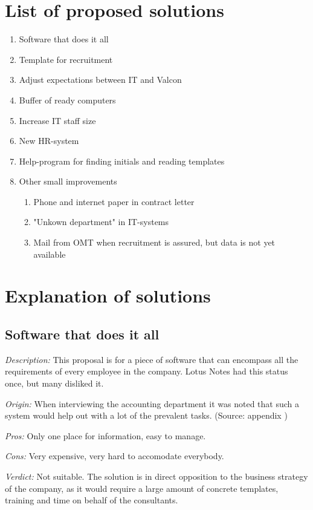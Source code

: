 \label{app:solution_propositions}
\section{List of proposed solutions}
\begin{enumerate}
\item Software that does it all
\item Template for recruitment
\item Adjust expectations between IT and Valcon
\item Buffer of ready computers
\item Increase IT staff size
\item New HR-system
\item Help-program for finding initials and reading templates
	\item Other small improvements
	\begin{enumerate}
	\item Phone and internet paper in contract letter
	\item "Unkown department" in IT-systems
	\item Mail from OMT when recruitment is assured, but data is not yet available
	\end{enumerate}
\end{enumerate}

\section{Explanation of solutions}
\subsection{Software that does it all}
\emph{Description:} This proposal is for a piece of software that can encompass all the requirements of every employee in the company. Lotus Notes had this status once, but many disliked it.

\emph{Origin:}
When interviewing the accounting department it was noted that such a system would help out with a lot of the prevalent tasks.
(Source: appendix )

\noindent \emph{Pros:} Only one place for information, easy to manage.

\noindent \emph{Cons:} Very expensive, very hard to accomodate everybody.

\emph {Verdict:}
Not suitable. The solution is in direct opposition to the business strategy of the company, as it would require a large amount of concrete templates, training and time on behalf of the consultants.

